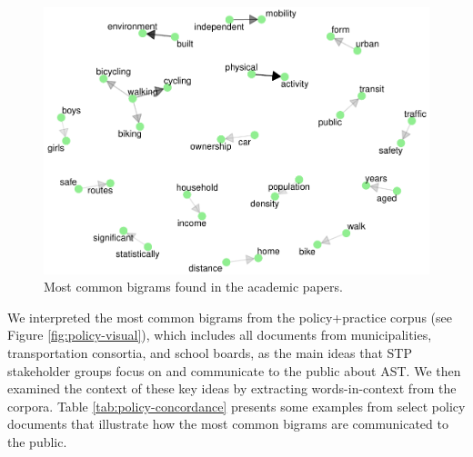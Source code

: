 \documentclass[]{elsarticle} %
\begin{document}
\begin{figure}

{\centering \includegraphics[width=1\linewidth]{AST-Framing-Ontario_files/figure-latex/academic-visual-1} 

}

\caption{\label{fig:academic-visual}Most common bigrams found in the academic papers.}\label{fig:academic-visual}
\end{figure}

We interpreted the most common bigrams from the policy+practice corpus
(see Figure \ref{fig:policy-visual}), which includes all documents from
municipalities, transportation consortia, and school boards, as the main
ideas that STP stakeholder groups focus on and communicate to the public
about AST. We then examined the context of these key ideas by extracting
words-in-context from the corpora. Table \ref{tab:policy-concordance}
presents some examples from select policy documents that illustrate how
the most common bigrams are communicated to the public.
\end{document}
